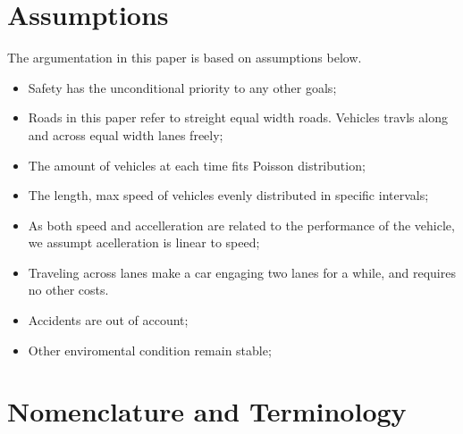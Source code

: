 \section{Assumptions}
The argumentation in this paper is based on assumptions below. 
\begin{itemize}
  \item Safety has the unconditional priority to any other goals; 
  \item Roads in this paper refer to streight equal width roads. Vehicles travls along and across equal width lanes freely; 
  \item The amount of vehicles at each time fits Poisson distribution\cite{breiman1963}; 
  \item The length, max speed of vehicles evenly distributed in specific intervals; 
  \item As both speed and accelleration are related to the performance of the vehicle, we assumpt acelleration is linear to speed; 
  \item Traveling across lanes make a car engaging two lanes for a while, and requires no other costs. 
  \item Accidents are out of account; 
  \item Other enviromental condition remain stable; 
\end{itemize}
\section{Nomenclature and Terminology}
\begin{table}[H]
\end{table}
